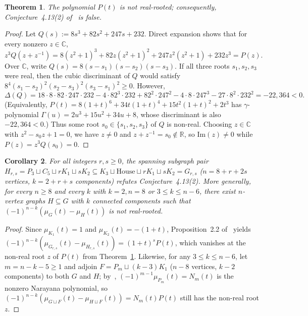 \documentclass[11pt]{article}
\newtheorem{theorem}{Theorem}[section]
\newtheorem{corollary}[theorem]{Corollary}
\theoremstyle{remark}
\begin{document}
\begin{theorem}\label{thm:disproof}
The polynomial $P(t)$ is not real-rooted; consequently, Conjecture~4.13(2) of~\cite{GDW2026} is false.
\end{theorem}

\begin{proof}
Let $Q(s) := 8s^3 + 82s^2 + 247s + 232$. Direct expansion shows that for every nonzero $z \in \mathbb{C}$,
\[
  z^3 Q(z + z^{-1}) = 8(z^2 + 1)^3 + 82 z(z^2 + 1)^2 + 247 z^2(z^2 + 1) + 232 z^3 = P(z).
\]
Over $\mathbb{C}$, write $Q(s) = 8(s - s_1)(s - s_2)(s - s_3)$. If all three roots $s_1, s_2, s_3$ were real, then the cubic discriminant of $Q$ would satisfy $8^4(s_1 - s_2)^2(s_2 - s_3)^2(s_3 - s_1)^2 \ge 0$. However,
\[
  \Delta(Q) = 18 \cdot 8 \cdot 82 \cdot 247 \cdot 232 - 4 \cdot 82^3 \cdot 232 + 82^2 \cdot 247^2 - 4 \cdot 8 \cdot 247^3 - 27 \cdot 8^2 \cdot 232^2 = -22{,}364 < 0.
\]
(Equivalently, $P(t) = 8(1+t)^6 + 34t(1+t)^4 + 15t^2(1+t)^2 + 2t^3$ has $\gamma$-polynomial $\Gamma(u) = 2u^3 + 15u^2 + 34u + 8$, whose discriminant is also $-22{,}364 < 0$.) Thus some root $s_0 \in \{s_1, s_2, s_3\}$ of $Q$ is non-real. Choosing $z \in \mathbb{C}$ with $z^2 - s_0 z + 1 = 0$, we have $z \ne 0$ and $z + z^{-1} = s_0 \notin \mathbb{R}$, so $\mathrm{Im}(z) \ne 0$ while $P(z) = z^3 Q(s_0) = 0$.
\end{proof}

\begin{corollary}\label{cor:family}
For all integers $r, s \ge 0$, the spanning subgraph pair $H_{r,s} = P_3 \sqcup C_5 \sqcup r K_1 \sqcup s K_2 \subseteq K_3 \sqcup \mathrm{House} \sqcup r K_1 \sqcup s K_2 = G_{r,s}$ ($n = 8 + r + 2s$ vertices, $k = 2 + r + s$ components) refutes Conjecture~4.13(2). More generally, for every $n \ge 8$ and every $k$ with $k = 2, n = 8$ or $3 \le k \le n - 6$, there exist $n$-vertex graphs $H \subseteq G$ with $k$ connected components such that $(-1)^{n-k}(\mu_G(t) - \mu_H(t))$ is not real-rooted.
\end{corollary}

\begin{proof}
Since $\mu_{K_1}(t) = 1$ and $\mu_{K_2}(t) = -(1 + t)$, Proposition~2.2 of~\cite{GDW2026} yields $(-1)^{n-k}(\mu_{G_{r,s}}(t) - \mu_{H_{r,s}}(t)) = (1 + t)^s P(t)$, which vanishes at the non-real root $z$ of $P(t)$ from Theorem~\ref{thm:disproof}. Likewise, for any $3 \le k \le n - 6$, let $m = n - k - 5 \ge 1$ and adjoin $F = P_m \sqcup (k - 3) K_1$ ($n - 8$ vertices, $k - 2$ components) to both $G$ and $H$; by~\cite[Theorem~3.2]{GDW2026}, $(-1)^{m-1}\mu_{P_m}(t) = N_m(t)$ is the nonzero Narayana polynomial, so $(-1)^{n-k}(\mu_{G \sqcup F}(t) - \mu_{H \sqcup F}(t)) = N_m(t) P(t)$ still has the non-real root $z$.
\end{proof}
\end{document}

